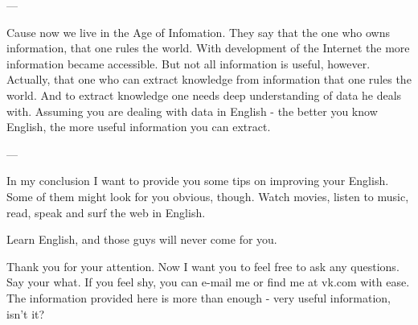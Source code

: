\documentclass[a4paper, 14pt]{extarticle}
\begin{document}
---

Cause now we live in the Age of Infomation. They say that the one who owns
information, that one rules the world. With development of the Internet the
more information became accessible. But not all information is useful, however.
Actually, that one who can extract knowledge from information that one rules
the world. And to extract knowledge one needs deep understanding of data he
deals with. Assuming you are dealing with data in English - the better you know
English, the more useful information you can extract.

---

In my conclusion I want to provide you some tips on improving your English.
Some of them might look for you obvious, though. Watch movies, listen to music,
read, speak and surf the web in English.

Learn English, and those guys will never come for you.

Thank you for your attention. Now I want you to feel free to ask any questions.
Say your what. If you feel shy, you can e-mail me or find me
at vk.com with ease. The information provided here is more than enough - very
useful information, isn't it?
\end{document}
